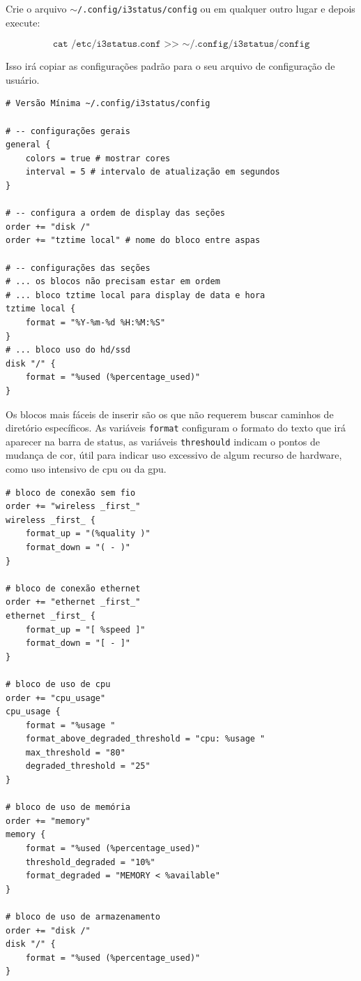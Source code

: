 \documentclass[12pt,a4paper]{article}
\begin{document}
Crie o arquivo \texttt{$\sim$/.config/i3status/config} ou em qualquer outro lugar e depois execute:

$$\texttt{cat /etc/i3status.conf >> $\sim$/.config/i3status/config}$$

Isso irá copiar as configurações padrão para o seu arquivo de configuração de usuário. \\

\begin{lstlisting}
# Versão Mínima ~/.config/i3status/config

# -- configurações gerais
general {
    colors = true # mostrar cores
    interval = 5 # intervalo de atualização em segundos
}

# -- configura a ordem de display das seções
order += "disk /"
order += "tztime local" # nome do bloco entre aspas

# -- configurações das seções 
# ... os blocos não precisam estar em ordem 
# ... bloco tztime local para display de data e hora
tztime local { 
    format = "%Y-%m-%d %H:%M:%S"
}
# ... bloco uso do hd/ssd
disk "/" {
    format = "%used (%percentage_used)"
}
\end{lstlisting} 

Os blocos mais fáceis de inserir são os que não requerem buscar caminhos de diretório específicos. As variáveis \texttt{format} configuram o formato do texto que irá aparecer na barra de status, as variáveis \texttt{threshould} indicam o pontos de mudança de cor, útil para indicar uso excessivo de algum recurso de hardware, como uso intensivo de cpu ou da gpu. \\

\begin{lstlisting}
# bloco de conexão sem fio 
order += "wireless _first_"
wireless _first_ {
    format_up = "(%quality )"
    format_down = "( - )"
}

# bloco de conexão ethernet
order += "ethernet _first_"
ethernet _first_ {
    format_up = "[ %speed ]"
    format_down = "[ - ]"
}

# bloco de uso de cpu 
order += "cpu_usage"
cpu_usage {
    format = "%usage "
    format_above_degraded_threshold = "cpu: %usage "
    max_threshold = "80"
    degraded_threshold = "25"
}

# bloco de uso de memória 
order += "memory"
memory {
    format = "%used (%percentage_used)"
    threshold_degraded = "10%"
    format_degraded = "MEMORY < %available"
}

# bloco de uso de armazenamento
order += "disk /"
disk "/" {
    format = "%used (%percentage_used)"
}
\end{lstlisting}
\end{document}
